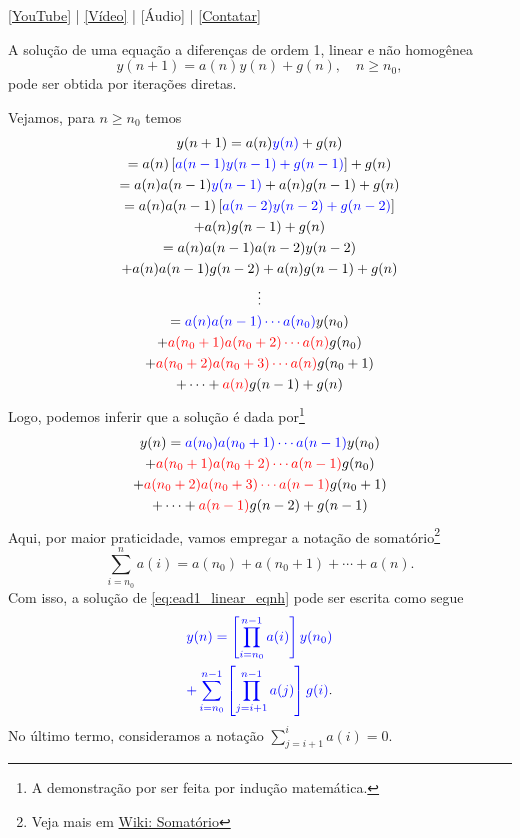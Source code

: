 \begin{flushright}
  \href{https://youtu.be/tYwlWmEeMFo}{[YouTube]} | \href{https://archive.org/details/ead-o1nh}{[Vídeo]} | [Áudio] | \href{https://phkonzen.github.io/notas/contato.html}{[Contatar]}
\end{flushright}

A solução de uma equação a diferenças de ordem 1, linear e não homogênea
\begin{equation}\label{eq:ead1_linear_eqnh}
  y(n+1) = a(n)y(n) + g(n),\quad n\geq n_0,
\end{equation}
pode ser obtida por iterações diretas.

Vejamos, para $n\geq n_0$ temos
\begin{gather}
  y(n+1) = a(n){\color{blue}y(n)} + g(n) \\
  = a(n)\left[{\color{blue}a(n-1)y(n-1)+g(n-1)}\right] + g(n) \\
  = a(n)a(n-1){\color{blue}y(n-1)}+a(n)g(n-1) + g(n) \\
  = a(n)a(n-1)\left[{\color{blue}a(n-2)y(n-2)+g(n-2)}\right] \nonumber\\
  + a(n)g(n-1) + g(n) \\
  = a(n)a(n-1)a(n-2)y(n-2) \nonumber\\
  + a(n)a(n-1)g(n-2) + a(n)g(n-1) + g(n) \\
  \vdots\nonumber\\
  = {\color{blue}a(n)a(n-1)\cdots a(n_0)}y(n_0) \nonumber\\
  + {\color{red}a(n_0+1)a(n_0+2)\cdots a(n)}g(n_0) \nonumber\\
  + {\color{red}a(n_0+2)a(n_0+3)\cdots a(n)}g(n_0+1) \nonumber\\
  + \cdots + {\color{red}a(n)}g(n-1) + g(n)
\end{gather}
Logo, podemos inferir que a solução é dada por\footnote{A demonstração por ser feita por indução matemática.}
\begin{gather}
  y(n) = {\color{blue}a(n_0)a(n_0+1)\cdots a(n-1)}y(n_0) \nonumber\\
  + {\color{red}a(n_0+1)a(n_0+2)\cdots a(n-1)}g(n_0) \nonumber\\
  + {\color{red}a(n_0+2)a(n_0+3)\cdots a(n-1)}g(n_0+1) \nonumber\\
  + \cdots + {\color{red}a(n-1)}g(n-2) + g(n-1)
\end{gather}
Aqui, por maior praticidade, vamos empregar a notação de somatório\footnote{Veja mais em \href{https://pt.wikipedia.org/wiki/Somat\%C3\%B3rio}{Wiki: Somatório}}
\begin{equation}
  \sum_{i=n_0}^{n} a(i) = a(n_0) + a(n_0+1) + \cdots + a(n).
\end{equation}
Com isso, a solução de \eqref{eq:ead1_linear_eqnh} pode ser escrita como segue
\begin{gather}
  {\color{blue}y(n) = \left[\prod_{i=n_0}^{n-1} a(i)\right]y(n_0)} \nonumber\\
  {\color{blue}+ \sum_{i=n_0}^{n-1}\left[\prod_{j=i+1}^{n-1} a(j)\right]g(i)}. \label{eq:ead1_linear_eqnh_sol}
\end{gather}
No último termo, consideramos a notação $\sum_{j=i+1}^i a(i) = 0$.


